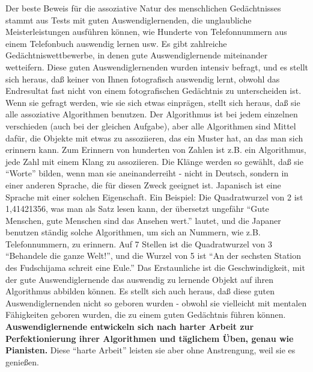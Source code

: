 Der beste Beweis für die assoziative Natur des menschlichen Gedächtnisses stammt aus Tests mit guten Auswendiglernenden, die unglaubliche Meisterleistungen ausführen können, wie Hunderte von Telefonnummern aus einem Telefonbuch auswendig lernen usw.
Es gibt zahlreiche Gedächtniswettbewerbe, in denen gute Auswendiglernende miteinander wetteifern.
Diese guten Auswendiglernenden wurden intensiv befragt, und es stellt sich heraus, daß keiner von Ihnen fotografisch auswendig lernt, obwohl das Endresultat fast nicht von einem fotografischen Gedächtnis zu unterscheiden ist.
Wenn sie gefragt werden, wie sie sich etwas einprägen, stellt sich heraus, daß sie alle assoziative Algorithmen benutzen.
Der Algorithmus ist bei jedem einzelnen verschieden (auch bei der gleichen Aufgabe), aber alle Algorithmen sind Mittel dafür, die Objekte mit etwas zu assoziieren, das ein Muster hat, an das man sich erinnern kann.
Zum Erinnern von hunderten von Zahlen ist z.B. ein Algorithmus, jede Zahl mit einem Klang zu assoziieren.
Die Klänge werden so gewählt, daß sie \enquote{Worte} bilden, wenn man sie aneinanderreiht - nicht in Deutsch, sondern in einer anderen Sprache, die für diesen Zweck geeignet ist.
Japanisch ist eine Sprache mit einer solchen Eigenschaft.
Ein Beispiel: Die Quadratwurzel von 2 ist 1,41421356, was man als Satz lesen kann, der übersetzt ungefähr \enquote{Gute Menschen, gute Menschen sind das Ansehen wert.} lautet, und die Japaner benutzen ständig solche Algorithmen, um sich an Nummern, wie z.B. Telefonnummern, zu erinnern.
Auf 7 Stellen ist die Quadratwurzel von 3 \enquote{Behandele die ganze Welt!}, und die Wurzel von 5 ist \enquote{An der sechsten Station des Fudschijama schreit eine Eule.}
Das Erstaunliche ist die Geschwindigkeit, mit der gute Auswendiglernende das auswendig zu lernende Objekt auf ihren Algorithmus abbilden können.
Es stellt sich auch heraus, daß diese guten Auswendiglernenden nicht so geboren wurden - obwohl sie vielleicht mit mentalen Fähigkeiten geboren wurden, die zu einem guten Gedächtnis führen können.
\textbf{Auswendiglernende entwickeln sich nach harter Arbeit zur Perfektionierung ihrer Algorithmen und täglichem Üben, genau wie Pianisten.}
Diese \enquote{harte Arbeit} leisten sie aber ohne Anstrengung, weil sie es genießen.


